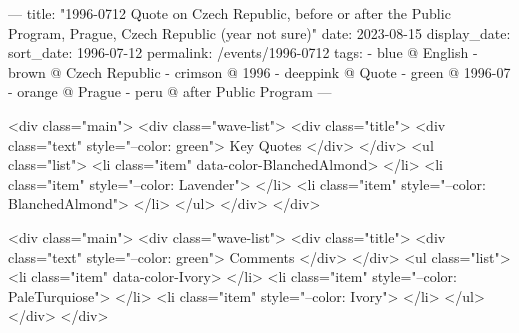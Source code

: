 ---
title: "1996-0712 Quote on Czech Republic, before or after the Public Program, Prague, Czech Republic (year not sure)"
date: 2023-08-15
display_date: 
sort_date: 1996-07-12
permalink: /events/1996-0712
tags:
  - blue @ English
  - brown @ Czech Republic
  - crimson @ 1996
  - deeppink @ Quote
  - green @ 1996-07
  - orange @ Prague
  - peru @ after Public Program
---

<div class="main">
  <div class="wave-list">
    <div class="title">
      <div class="text" style="--color: green">
        Key Quotes
      </div>
    </div>
    <ul class="list">
        <li class="item" data-color-BlanchedAlmond>
        </li>
        <li class="item" style="--color: Lavender">
        </li>
        <li class="item" style="--color: BlanchedAlmond">
        </li>
      </ul>
  </div>
</div>

<div class="main">
  <div class="wave-list">
    <div class="title">
      <div class="text" style="--color: green">
        Comments
      </div>
    </div>
    <ul class="list">
        <li class="item" data-color-Ivory>
        </li>
        <li class="item" style="--color: PaleTurquiose">
        </li>
        <li class="item" style="--color: Ivory">
        </li>
      </ul>
  </div>
</div>